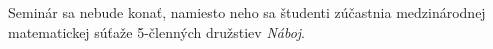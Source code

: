 

Seminár sa nebude konať, namiesto neho sa študenti zúčastnia medzinárodnej matematickej súťaže 5-členných družstiev \textit{Náboj}.

